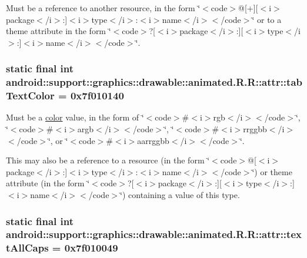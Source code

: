 Must be a reference to another resource, in the form \char`\"{}$<$code$>$@\mbox{[}+\mbox{]}\mbox{[}$<$i$>$package$<$/i$>$:\mbox{]}$<$i$>$type$<$/i$>$:$<$i$>$name$<$/i$>$$<$/code$>$\char`\"{} or to a theme attribute in the form \char`\"{}$<$code$>$?\mbox{[}$<$i$>$package$<$/i$>$:\mbox{]}\mbox{[}$<$i$>$type$<$/i$>$:\mbox{]}$<$i$>$name$<$/i$>$$<$/code$>$\char`\"{}. \hypertarget{classandroid_1_1support_1_1graphics_1_1drawable_1_1animated_1_1_r_1_1attr_cb1f5929625770f3532d7c136a393cd9}{
\subsubsection[{tabTextColor}]{\setlength{\rightskip}{0pt plus 5cm}static final int android::support::graphics::drawable::animated.R.R::attr::tabTextColor = 0x7f010140}}
\label{classandroid_1_1support_1_1graphics_1_1drawable_1_1animated_1_1_r_1_1attr_cb1f5929625770f3532d7c136a393cd9}


Must be a \hyperlink{classandroid_1_1support_1_1graphics_1_1drawable_1_1animated_1_1_r_1_1color}{color} value, in the form of \char`\"{}$<$code$>$\#$<$i$>$rgb$<$/i$>$$<$/code$>$\char`\"{}, \char`\"{}$<$code$>$\#$<$i$>$argb$<$/i$>$$<$/code$>$\char`\"{}, \char`\"{}$<$code$>$\#$<$i$>$rrggbb$<$/i$>$$<$/code$>$\char`\"{}, or \char`\"{}$<$code$>$\#$<$i$>$aarrggbb$<$/i$>$$<$/code$>$\char`\"{}. 

This may also be a reference to a resource (in the form \char`\"{}$<$code$>$@\mbox{[}$<$i$>$package$<$/i$>$:\mbox{]}$<$i$>$type$<$/i$>$:$<$i$>$name$<$/i$>$$<$/code$>$\char`\"{}) or theme attribute (in the form \char`\"{}$<$code$>$?\mbox{[}$<$i$>$package$<$/i$>$:\mbox{]}\mbox{[}$<$i$>$type$<$/i$>$:\mbox{]}$<$i$>$name$<$/i$>$$<$/code$>$\char`\"{}) containing a value of this type. \hypertarget{classandroid_1_1support_1_1graphics_1_1drawable_1_1animated_1_1_r_1_1attr_f3593b56668cc8f5a7e7445dbca6e418}{
\subsubsection[{textAllCaps}]{\setlength{\rightskip}{0pt plus 5cm}static final int android::support::graphics::drawable::animated.R.R::attr::textAllCaps = 0x7f010049}}
\label{classandroid_1_1support_1_1graphics_1_1drawable_1_1animated_1_1_r_1_1attr_f3593b56668cc8f5a7e7445dbca6e418}


